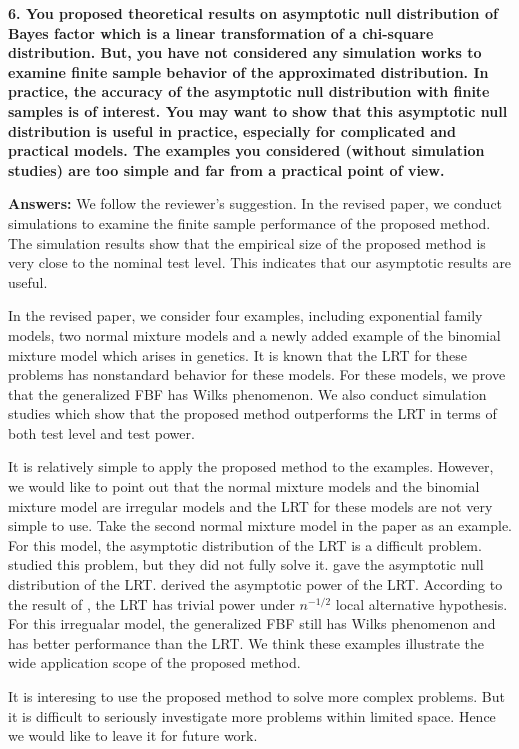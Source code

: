\documentclass[11pt]{article}
\theoremstyle{plain}
\theoremstyle{definition}
\theoremstyle{remark}
\begin{document}
\textbf{
    6. You proposed theoretical results on asymptotic null distribution of Bayes factor which is a linear transformation of a chi-square distribution.
    But, you have not considered any simulation works to examine finite sample behavior of the approximated distribution.
    In practice, the accuracy of the asymptotic null distribution with finite samples is of interest.
    You may want to show that this asymptotic null distribution is useful in practice, especially for complicated and practical models.
    The examples you considered (without simulation studies) are too simple and far from a practical point of view.
}

\textbf{Answers:}
We follow the reviewer's suggestion.
In the revised paper, we conduct simulations to examine the finite sample performance of the proposed method.
The simulation results show that the empirical size of the proposed method is very close to the nominal test level.
This indicates that our asymptotic results are useful.

In the revised paper, we consider four examples, including exponential family models, two normal mixture models and a newly added example of the binomial mixture model which arises in genetics.
It is known that the LRT for these problems has nonstandard behavior for these models.
For these models, we prove that the generalized FBF has Wilks phenomenon.
We also conduct simulation studies which show that the proposed method outperforms the LRT in terms of both test level and test power.

It is relatively simple to apply the proposed method to the examples.
However, we would like to point out that the normal mixture models and the binomial mixture model are irregular models and the LRT for these models are not very simple to use.
Take the second normal mixture model in the paper as an example.
For this model, the asymptotic distribution of the LRT is a difficult problem.
\cite{bickel1993} studied this problem, but they did not fully solve it.
\cite{LIU200461} gave the asymptotic null distribution of the LRT.
\cite{HALL2005158} derived the asymptotic power of the LRT.
According to the result of \cite{HALL2005158}, the LRT has trivial power under $n^{-1/2}$ local alternative hypothesis.
For this irregualar model, the generalized FBF still has Wilks phenomenon and has better performance than the LRT.
We think these examples illustrate the wide application scope of the proposed method.

It is interesing to use the proposed method to solve more complex problems.
But it is difficult to seriously investigate more problems within limited space.
Hence we would like to leave it for future work.
\end{document}
